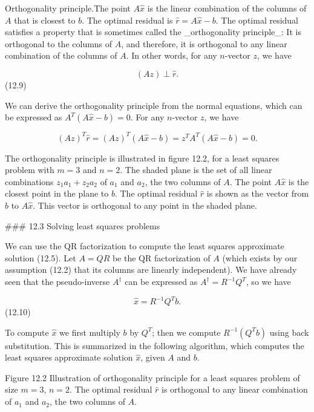 Orthogonality principle.The point \(A\hat{x}\) is the linear combination of the columns of \(A\) that is closest to \(b\). The optimal residual is \(\hat{r}=A\hat{x}-b\). The optimal residual satisfies a property that is sometimes called the _orthogonality principle_: It is orthogonal to the columns of \(A\), and therefore, it is orthogonal to any linear combination of the columns of \(A\). In other words, for any \(n\)-vector \(z\), we have

\[(Az)\perp\hat{r}.\] (12.9)

We can derive the orthogonality principle from the normal equations, which can be expressed as \(A^{T}(A\hat{x}-b)=0\). For any \(n\)-vector \(z\), we have

\[(Az)^{T}\hat{r}=(Az)^{T}(A\hat{x}-b)=z^{T}A^{T}(A\hat{x}-b)=0.\]

The orthogonality principle is illustrated in figure 12.2, for a least squares problem with \(m=3\) and \(n=2\). The shaded plane is the set of all linear combinations \(z_{1}a_{1}+z_{2}a_{2}\) of \(a_{1}\) and \(a_{2}\), the two columns of \(A\). The point \(A\hat{x}\) is the closest point in the plane to \(b\). The optimal residual \(\hat{r}\) is shown as the vector from \(b\) to \(A\hat{x}\). This vector is orthogonal to any point in the shaded plane.

### 12.3 Solving least squares problems

We can use the QR factorization to compute the least squares approximate solution (12.5). Let \(A=QR\) be the QR factorization of \(A\) (which exists by our assumption (12.2) that its columns are linearly independent). We have already seen that the pseudo-inverse \(A^{\dagger}\) can be expressed as \(A^{\dagger}=R^{-1}Q^{T}\), so we have

\[\hat{x}=R^{-1}Q^{T}b.\] (12.10)

To compute \(\hat{x}\) we first multiply \(b\) by \(Q^{T}\); then we compute \(R^{-1}(Q^{T}b)\) using back substitution. This is summarized in the following algorithm, which computes the least squares approximate solution \(\hat{x}\), given \(A\) and \(b\).

Figure 12.2 Illustration of orthogonality principle for a least squares problem of size \(m=3\), \(n=2\). The optimal residual \(\hat{r}\) is orthogonal to any linear combination of \(a_{1}\) and \(a_{2}\), the two columns of \(A\).

 
